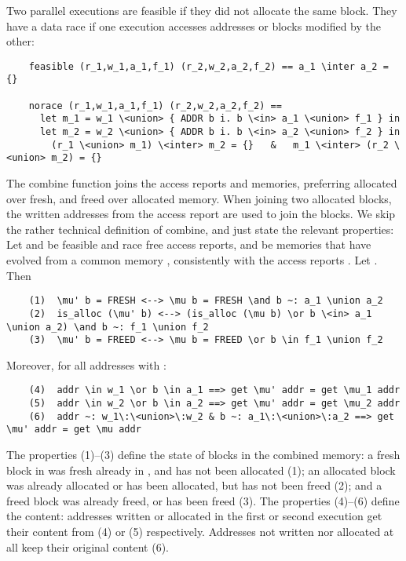 \documentclass[sn-mathphys,Numbered]{sn-jnl}
\theoremstyle{thmstyleone}%
\theoremstyle{definition}%
\theoremstyle{thmstylethree}%
\begin{document}
  Two parallel executions are feasible if they did not allocate the same block. They have a data race
  if one execution accesses addresses or blocks modified by the other:
  \begin{lstlisting}
    feasible (r_1,w_1,a_1,f_1) (r_2,w_2,a_2,f_2) == a_1 \inter a_2 = {}

    norace (r_1,w_1,a_1,f_1) (r_2,w_2,a_2,f_2) ==
      let m_1 = w_1 \<union> { ADDR b i. b \<in> a_1 \<union> f_1 } in
      let m_2 = w_2 \<union> { ADDR b i. b \<in> a_2 \<union> f_2 } in
        (r_1 \<union> m_1) \<inter> m_2 = {}   &   m_1 \<inter> (r_2 \<union> m_2) = {}
  \end{lstlisting}
  The combine function joins the access reports and memories,
  preferring allocated over fresh, and freed over allocated memory. When joining two allocated blocks, the written addresses
  from the access report are used to join the blocks. We skip the rather technical definition of combine, and just state the
  relevant properties: Let  and  be feasible and race free access reports,
  and  be memories that have evolved from a common memory \is{\mu}, consistently with
  the access reports . Let . Then
  \begin{lstlisting}
    (1)  \mu' b = FRESH <--> \mu b = FRESH \and b ~: a_1 \union a_2
    (2)  is_alloc (\mu' b) <--> (is_alloc (\mu b) \or b \<in> a_1 \union a_2) \and b ~: f_1 \union f_2
    (3)  \mu' b = FREED <--> \mu b = FREED \or b \in f_1 \union f_2
  \end{lstlisting}
  Moreover, for all addresses  with :
  \begin{lstlisting}
    (4)  addr \in w_1 \or b \in a_1 ==> get \mu' addr = get \mu_1 addr
    (5)  addr \in w_2 \or b \in a_2 ==> get \mu' addr = get \mu_2 addr
    (6)  addr ~: w_1\:\<union>\:w_2 & b ~: a_1\:\<union>\:a_2 ==> get \mu' addr = get \mu addr
  \end{lstlisting}
  The properties (1)--(3) define the state of blocks in the combined memory:
  a fresh block in  was fresh already in \is{\mu}, and has not been allocated (1);
  an allocated block was already allocated or has been allocated, but has not been freed (2); and a freed block was already freed, or has been freed (3).
  The properties (4)--(6) define the content: addresses written or allocated in the first or second execution get their content from  (4) or  (5) respectively.
  Addresses not written nor allocated at all keep their original content (6).
\end{document}
